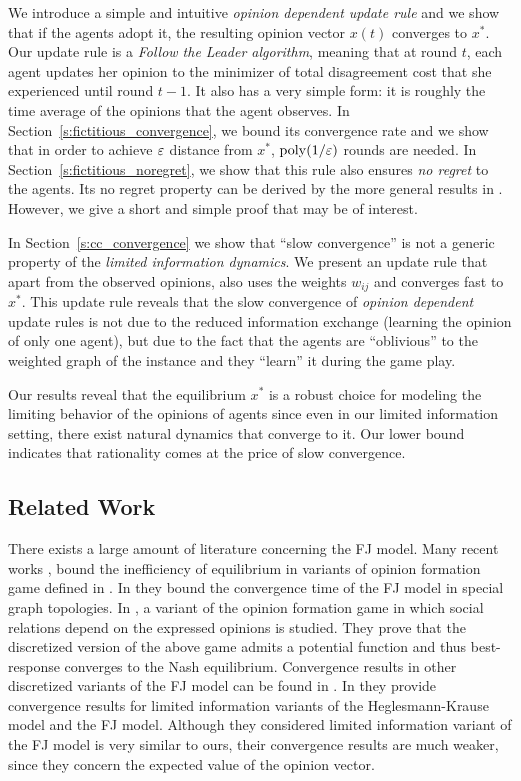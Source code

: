 We introduce a simple and intuitive \emph{opinion dependent update rule} and we
show that if the agents adopt it, the resulting opinion vector $x(t)$ converges
to $x^*$.  Our update rule is a \emph{Follow the Leader algorithm}, meaning
that at round $t$, each agent updates her opinion to the minimizer of total
disagreement cost that she experienced until round $t-1$.  It also has a very
simple form: it is roughly the time average of the opinions that the agent
observes.  In Section~\ref{s:fictitious_convergence}, we bound its convergence
rate and we show that in order to achieve $\varepsilon$ distance from $x^*$,
$\mathrm{poly}(1/\varepsilon)$ rounds are needed.  In
Section~\ref{s:fictitious_noregret}, we show that this rule also ensures
\emph{no regret} to the agents.  Its no regret property can be derived by the
more general results in \cite{HAK07}.  However, we give a short and simple
proof that may be of interest.

In Section~\ref{s:cc_convergence} we show that \enquote{slow convergence} is
not a generic property of the \emph{limited information dynamics}.  We present
an update rule that apart from the observed opinions, also uses the weights
$w_{ij}$ and converges fast to $x^*$.  This update rule reveals that the slow
convergence of \emph{opinion dependent} update rules is not due to the reduced
information exchange (learning the opinion of only one agent), but due to the
fact that the agents are \enquote{oblivious} to the weighted graph of the
instance and they \enquote{learn} it during the game play.

Our results reveal that the equilibrium $x^*$ is a robust choice for modeling
the limiting behavior of the opinions of agents since even in our limited
information setting, there exist natural dynamics that converge to it.  Our
lower bound indicates that rationality comes at the price of slow
convergence.

\subsection{Related Work}

There exists a large amount of literature concerning the FJ model.  Many recent
works \cite{BGM13,CKO13}, \cite{BFM16,EFHS17} bound the inefficiency of
equilibrium in variants of opinion formation game defined in \cite{BKO11}. In
\cite{GS14} they bound the convergence time of the FJ model in special graph
topologies.  In \cite{BFM16}, a variant of the opinion formation game in which
social relations depend on the expressed opinions is studied.  They prove that
the discretized version of the above game admits a potential function and thus
best-response converges to the Nash equilibrium.  Convergence results in other
discretized variants of the FJ model can be found in \cite{YOASS13,FGV16}. In
\cite{FPS16} they provide convergence results for limited information variants
of the Heglesmann-Krause model \cite{HK} and the FJ model. Although they
considered limited information variant of the FJ model is very similar to ours,
their convergence results are much weaker, since they concern the expected
value of the opinion vector.


